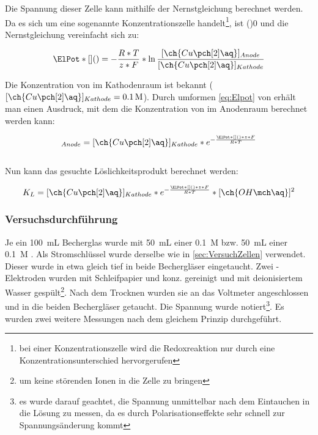 \documentclass{article}
\begin{document}
      Die Spannung dieser Zelle kann mithilfe der Nernstgleichung berechnet werden. Da es sich um eine sogenannte Konzentrationszelle handelt\footnote{bei einer Konzentrationszelle wird die Redoxreaktion nur durch eine Konzentrationsunterschied hervorgerufen}, ist \ElPot[superscript=0](){0} und die Nernstgleichung vereinfacht sich zu:
      
      \begin{equation}
        \ElPot*[](){} = - \frac{R * T}{z * F} * \ln \frac{[\ch{Cu\pch[2]\aq}]_{Anode}}{[\ch{Cu\pch[2]\aq}]_{Kathode}} \label{eq:Elpot}
      \end{equation}
      
      Die Konzentration von  im Kathodenraum ist bekannt ($[\ch{Cu\pch[2]\aq}]_{Kathode} = \SI[mode=text]{0.1}{M}$). Durch umformen \ref{eq:Elpot} von erhält man einen Ausdruck, mit dem die Konzentration von  im Anodenraum berechnet werden kann:
      
      \begin{equation}
        [\ch{Cu\pch[2]\aq}]_{Anode} = [\ch{Cu\pch[2]\aq}]_{Kathode} * e^{- \frac{\ElPot*[](){} * z * F}{R * T}} 
      \end{equation} \\
      
      Nun kann das gesuchte Löslichkeitsprodukt berechnet werden:
      
      \begin{equation}
        K_{L} = [\ch{Cu\pch[2]\aq}]_{Kathode} * e^{- \frac{\ElPot*[](){} * z * F}{R * T}} * [\ch{OH\mch\aq}]^2 \label{eq:Loslichkeitsproduktfinale}
      \end{equation}
      
      \subsubsection{Versuchsdurchführung} \label{sec:VersuchsdurchfuhrungLoslichkeit}
      
      Je ein \SI[mode=text]{100}{\milli\liter} Becherglas wurde mit \SI[mode=text]{50}{\milli\liter} einer \SI[mode=text]{0.1}{M}  bzw. \SI[mode=text]{50}{\milli\liter} einer \SI[mode=text]{0.1}{M} . Als Stromschlüssel wurde derselbe wie in \ref{sec:VersuchZellen} verwendet. Dieser wurde in etwa gleich tief in beide Bechergläser eingetaucht. Zwei -Elektroden wurden mit Schleifpapier und konz.  gereinigt und mit deionisiertem Wasser gespült\footnote{um keine störenden Ionen in die Zelle zu bringen}. Nach dem Trocknen wurden sie an das Voltmeter angeschlossen und in die beiden Bechergläser getaucht. Die Spannung wurde notiert\footnote{es wurde darauf geachtet, die Spannung unmittelbar nach dem Eintauchen in die Lösung zu messen, da es durch Polarisationseffekte sehr schnell zur Spannungsänderung kommt}. Es wurden zwei weitere Messungen nach dem gleichem Prinzip durchgeführt.
      
\end{document}
